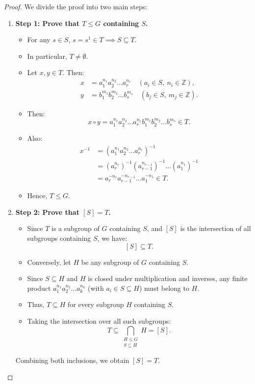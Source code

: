 \documentclass[12pt]{article}
\theoremstyle{definition}
\theoremstyle{plain}
\begin{document}
\begin{proof}
We divide the proof into two main steps:
\begin{enumerate}
    \item \textbf{Step 1: Prove that $T \le G$ containing $S$.}
    \begin{itemize}
        \item For any $s \in S$, $s = s^1 \in T \implies S \subseteq T$.
        \item In particular, $T \neq \emptyset$.
        \item Let $x, y \in T$. Then:
        \begin{align*}
            x &= a_1^{n_1} a_2^{n_2} \dots a_r^{n_r} \quad (a_i \in S,\ n_i \in \mathbb{Z}), \\
            y &= b_1^{m_1} b_2^{m_2} \dots b_s^{m_s} \quad (b_j \in S,\ m_j \in \mathbb{Z}).
        \end{align*}
        \item Then:
        \[
        x \circ y = a_1^{n_1} a_2^{n_2} \dots a_r^{n_r} b_1^{m_1} b_2^{m_2} \dots b_s^{m_s} \in T.
        \]
        \item Also:
        \begin{align*}
            x^{-1} &= (a_1^{n_1} a_2^{n_2} \dots a_r^{n_r})^{-1} \\
            &= (a_r^{n_r})^{-1} (a_{r-1}^{n_{r-1}})^{-1} \dots (a_1^{n_1})^{-1} \\
            &= a_r^{-n_r} a_{r-1}^{-n_{r-1}} \dots a_1^{-n_1} \in T.
        \end{align*}
        \item Hence, $T \le G$.
    \end{itemize}

    \item \textbf{Step 2: Prove that $[S] = T$.}
    \begin{itemize}
        \item Since $T$ is a subgroup of $G$ containing $S$, and $[S]$ is the intersection of all subgroups containing $S$, we have:
        \[
        [S] \subseteq T.
        \]
        \item Conversely, let $H$ be any subgroup of $G$ containing $S$.
        \item Since $S \subseteq H$ and $H$ is closed under multiplication and inverses, any finite product $a_1^{n_1} a_2^{n_2} \dots a_k^{n_k}$ (with $a_i \in S \subseteq H$) must belong to $H$.
        \item Thus, $T \subseteq H$ for every subgroup $H$ containing $S$.
        \item Taking the intersection over all such subgroups:
        \[
        T \subseteq \bigcap_{\substack{H \le G \\ S \subseteq H}} H = [S].
        \]
    \end{itemize}
    Combining both inclusions, we obtain $\boxed{[S] = T}$.
\end{enumerate}
\end{proof}
\end{document}
